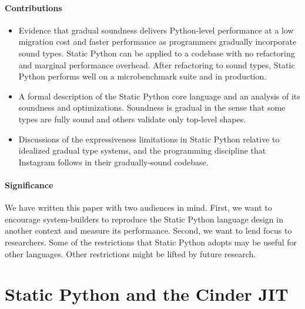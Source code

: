 \documentclass[english,cleveref,submission]{programming}
\newcommand{\SP}{Static Python}
\begin{document}
\paragraph*{Contributions}

\begin{itemize}
  \item
    Evidence that gradual soundness delivers Python-level performance at a low migration cost
    and faster performance as programmers gradually incorporate sound types.
    \SP{} can be applied to a codebase with no refactoring and marginal performance overhead.
    After refactoring to sound types, \SP{} performs well on a microbenchmark
    suite and in production.
  \item
    A formal description of the \SP{} core language and an analysis of its soundness
    and optimizations.
    Soundness is gradual in the sense that some types are fully sound and others validate
    only top-level shapes.
  \item
    Discussions of the expressiveness limitations in \SP{} relative to
    idealized gradual type systems, and the programming discipline that Instagram
    follows in their gradually-sound codebase.
\end{itemize}


\paragraph*{Significance}

We have written this paper with two audiences in mind.
First, we want to encourage system-builders to reproduce the
\SP{} language design in another context and measure its performance.
Second, we want to lend focus to researchers.
Some of the restrictions that \SP{} adopts may be useful for
other languages.
Other restrictions might be lifted by future research.


\section{\SP{} and the Cinder JIT}
\label{s:tour}

\end{document}

